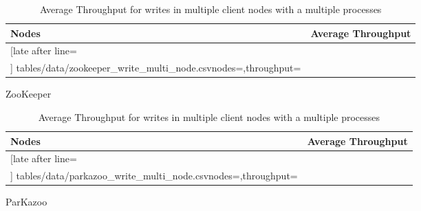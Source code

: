 \begin{table}[ht!]
	\centering
	\begin{subtable}[t]{0.45\linewidth}
		\begin{tabular}{|l|c|}\hline%
			\textbf{Nodes}   & \textbf{Average Throughput} \\\hline
			\csvreader[late after line=\\\hline]%
			{tables/data/zookeeper_write_multi_node.csv}{nodes=\nodes,throughput=\throughput}%
			{\nodes & \throughput}%
		\end{tabular}
		\caption{ZooKeeper}
		\label{table:zookeeper_multinode_throughput}
	\end{subtable}
	\quad
	\begin{subtable}[t]{0.45\linewidth}
		\begin{tabular}{|l|c|}\hline%
			\textbf{Nodes}   & \textbf{Average Throughput} \\\hline
			\csvreader[late after line=\\\hline]%
			{tables/data/parkazoo_write_multi_node.csv}{nodes=\nodes,throughput=\throughput}%
			{\nodes & \throughput}%
		\end{tabular}
		\caption{ParKazoo}
		\label{table:parkazoo_multinode_throughput}
	\end{subtable}
		
	\caption{Average Throughput for writes in multiple client nodes with a multiple processes}
	\label{table:multinode_throughput_all}
\end{table}
